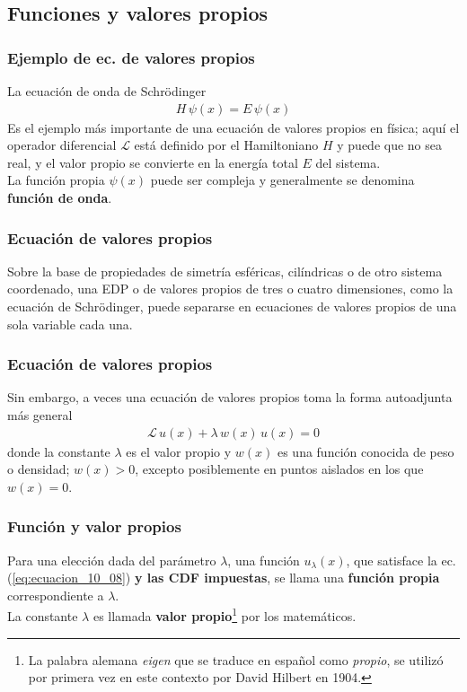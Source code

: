 \subsection{Funciones y valores propios}
\begin{frame}
\frametitle{Ejemplo de ec. de valores propios}
La ecuación de onda de Schrödinger
\begin{align*}
H \, \psi (x) = E \, \psi (x)
\end{align*}
\fontsize{12}{12}\selectfont
Es el ejemplo más importante de una ecuación de valores propios en física; aquí el operador diferencial $\mathcal{L}$ está definido por el Hamiltoniano $H$ y puede que no sea real, y el valor propio se convierte en la energía total $E$ del sistema.
\\
\bigskip
\pause
La función propia $\psi (x)$ puede ser compleja y generalmente se denomina \textbf{función de onda}.
\end{frame}
\begin{frame}
\frametitle{Ecuación de valores propios}
Sobre la base de propiedades de simetría esféricas, cilíndricas o de otro sistema coordenado, una EDP o de valores propios de tres o cuatro dimensiones, como la ecuación de Schrödinger, puede separarse en ecuaciones de valores propios de una sola variable cada una.
\end{frame}
\begin{frame}
\frametitle{Ecuación de valores propios}
Sin embargo, a veces una ecuación de valores propios toma la forma autoadjunta más general
\begin{align}
\mathcal{L} \, u(x) + \lambda \, w(x) \, u(x) = 0
\label{eq:ecuacion_10_08}
\end{align}
donde la constante $\lambda$ es el valor propio y $w(x)$ es una función conocida de peso o densidad; $w(x) > 0$, excepto posiblemente en puntos aislados en los que $w(x) = 0$.
\end{frame}
\begin{frame}
\frametitle{Función y valor propios}
Para una elección dada del parámetro $\lambda$, una función $u_{\lambda}(x)$, que satisface la ec. (\ref{eq:ecuacion_10_08}) \textbf{y las CDF impuestas}, se llama una \textbf{función propia} correspondiente a $\lambda$.
\\
\bigskip
\pause
La constante $\lambda$ es llamada \textbf{valor propio}\footnote{La palabra alemana \emph{eigen} que se traduce en español como \emph{propio}, se utilizó por primera vez en este contexto por David Hilbert en 1904.} por los matemáticos.
\end{frame}
